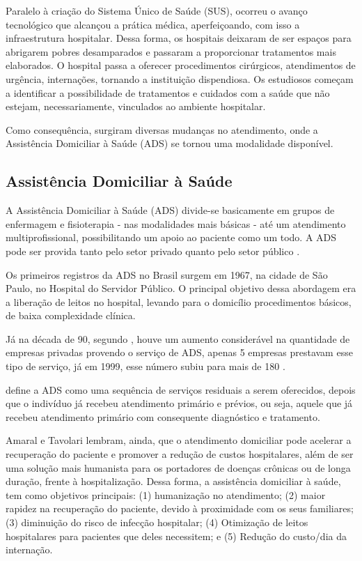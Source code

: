 Paralelo à criação do Sistema Único de Saúde (SUS), ocorreu o avanço tecnológico
que alcançou a prática médica, aperfeiçoando, com isso a infraestrutura
hospitalar. Dessa forma, os hospitais deixaram de ser espaços para abrigarem
pobres desamparados e passaram a proporcionar tratamentos mais elaborados. O
hospital passa a oferecer  procedimentos cirúrgicos, atendimentos de urgência,
internações, tornando a instituição dispendiosa. Os estudiosos começam a
identificar a possibilidade de tratamentos e cuidados com a  saúde que não
estejam, necessariamente, vinculados ao ambiente hospitalar.

Como consequência, surgiram diversas mudanças no atendimento, onde a Assistência
Domiciliar à Saúde (ADS) se tornou uma modalidade disponível.

\subsection{Assistência Domiciliar à Saúde}
\label{subsec:assistencia-domiciliar-a-saude}

A Assistência Domiciliar à Saúde (ADS) divide-se basicamente em grupos de
enfermagem e fisioterapia - nas modalidades mais básicas - até um atendimento
multiprofissional, possibilitando um apoio ao paciente como um todo. A ADS pode
ser provida tanto pelo setor privado quanto pelo setor público
\cite{amaral2001assistencia}.

Os primeiros registros da ADS no Brasil surgem em 1967, na cidade de São
Paulo, no Hospital do Servidor Público. O principal objetivo dessa abordagem
era a liberação de leitos no hospital, levando para o domicílio procedimentos
básicos, de baixa complexidade clínica.

Já na década de 90, segundo , houve um
aumento considerável na quantidade de empresas privadas provendo o serviço de
ADS, apenas 5 empresas prestavam esse tipo de  serviço, já em 1999, esse número
subiu para mais de 180 \cite{tavolari2000desenvolvimento}.

 define a ADS como uma sequência de serviços
residuais a serem oferecidos, depois que o indivíduo já recebeu atendimento
primário e prévios, ou seja, aquele que já recebeu atendimento primário com
consequente diagnóstico e tratamento.

Amaral e Tavolari lembram, ainda, que o atendimento domiciliar pode acelerar a
recuperação do  paciente e promover a redução de custos hospitalares, além de
ser uma solução mais  humanista para os portadores de doenças crônicas ou de
longa duração, frente à  hospitalização. Dessa forma, a assistência domiciliar à
saúde, tem como objetivos principais: (1) humanização no atendimento; (2) maior
rapidez na recuperação do paciente, devido à proximidade com os seus familiares;
(3) diminuição do risco de infecção hospitalar; (4) Otimização de leitos
hospitalares para pacientes que deles necessitem; e (5) Redução do custo/dia da
internação.

